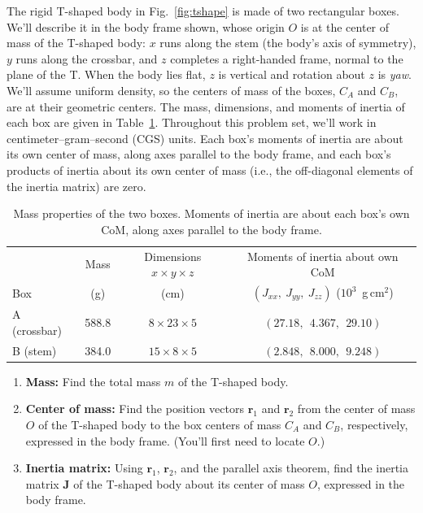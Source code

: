 \documentclass[11pt,letterpaper]{article}
\begin{document}
\noindent The rigid T-shaped body in Fig.~\ref{fig:tshape} is made of two rectangular boxes. We'll describe it in the body frame shown, whose origin $O$ is at the center of mass of the T-shaped body: $x$ runs along the stem (the body's axis of symmetry), $y$ runs along the crossbar, and $z$ completes a right-handed frame, normal to the plane of the T. When the body lies flat, $z$ is vertical and rotation about $z$ is \emph{yaw}. We'll assume uniform density, so the centers of mass of the boxes, $C_A$ and $C_B$, are at their geometric centers. The mass, dimensions, and moments of inertia of each box are given in Table~\ref{tab:boxes}. Throughout this problem set, we'll work in centimeter--gram--second (CGS) units. Each box's moments of inertia are about its own center of mass, along axes parallel to the body frame, and each box's products of inertia about its own center of mass (i.e., the off-diagonal elements of the inertia matrix) are zero.

\begin{table}[H]
\centering
\small
\begin{tabular}{lccc}
\toprule
 & Mass & Dimensions $x\times y\times z$ & Moments of inertia about own CoM \\
Box & (g) & (cm) & $(J_{xx},\ J_{yy},\ J_{zz})$ ($10^{3}$~g\,cm$^2$) \\
\midrule
A (crossbar) & 588.8 & $8\times23\times5$ & $(27.18,\ \ 4.367,\ \ 29.10)$ \\
B (stem)     & 384.0 & $15\times8\times5$ & $(2.848,\ \ 8.000,\ \ 9.248)$ \\
\bottomrule
\end{tabular}
\caption{Mass properties of the two boxes. Moments of inertia are about each box's own CoM, along axes parallel to the body frame.}
\label{tab:boxes}
\end{table}

\begin{enumerate}[label=(\alph*)]
    \item \textbf{Mass:} Find the total mass $m$ of the T-shaped body.

    \item \textbf{Center of mass:} Find the position vectors $\mathbf{r}_1$ and $\mathbf{r}_2$ from the center of mass $O$ of the T-shaped body to the box centers of mass $C_A$ and $C_B$, respectively, expressed in the body frame. (You'll first need to locate $O$.)

    \item \textbf{Inertia matrix:} Using $\mathbf{r}_1$, $\mathbf{r}_2$, and the parallel axis theorem, find the inertia matrix $\mathbf{J}$ of the T-shaped body about its center of mass $O$, expressed in the body frame.
\end{enumerate}
\end{document}

